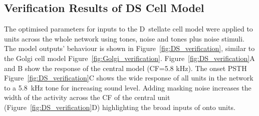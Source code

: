 \subsection{Verification Results of DS Cell Model}    \label{sec:DS:verification}


The optimised parameters for inputs to the D~stellate cell model were applied to \DS units across the whole network using tones, noise and tones plus noise stimuli. 
The \DS model outputs' behaviour is shown in Figure~\ref{fig:DS_verification}, similar to the Golgi cell model Figure~\ref{fig:Golgi_verification}. 
Figure~\ref{fig:DS_verification}A and B show the response of the central \DS model (CF=5.8 kHz). The onset PSTH 
Figure~\ref{fig:DS_verification}C shows the wide response of all \DS units in the network to a 5.8~kHz tone for increasing sound level. 
Adding masking noise increases the width of the activity across the CF of the central unit (Figure~\ref{fig:DS_verification}D) highlighting the broad inputs of \ANFs onto \DS units.


